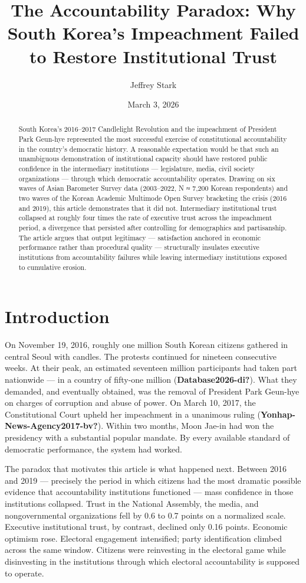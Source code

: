 \documentclass[
  12pt,
  letterpaper]{article}
\title{The Accountability Paradox: Why South Korea's Impeachment Failed
to Restore Institutional Trust}
\author{Jeffrey Stark}
\date{March 3, 2026}
\begin{document}
\maketitle
\begin{abstract}
South Korea's 2016--2017 Candlelight Revolution and the impeachment of
President Park Geun-hye represented the most successful exercise of
constitutional accountability in the country's democratic history. A
reasonable expectation would be that such an unambiguous demonstration
of institutional capacity should have restored public confidence in the
intermediary institutions --- legislature, media, civil society
organizations --- through which democratic accountability operates.
Drawing on six waves of Asian Barometer Survey data (2003--2022, N ≈
7,200 Korean respondents) and two waves of the Korean Academic Multimode
Open Survey bracketing the crisis (2016 and 2019), this article
demonstrates that it did not. Intermediary institutional trust collapsed
at roughly four times the rate of executive trust across the impeachment
period, a divergence that persisted after controlling for demographics
and partisanship. The article argues that output legitimacy ---
satisfaction anchored in economic performance rather than procedural
quality --- structurally insulates executive institutions from
accountability failures while leaving intermediary institutions exposed
to cumulative erosion.
\end{abstract}


\section{Introduction}\label{introduction}

On November 19, 2016, roughly one million South Korean citizens gathered
in central Seoul with candles. The protests continued for nineteen
consecutive weeks. At their peak, an estimated seventeen million
participants had taken part nationwide --- in a country of fifty-one
million (\textbf{Database2026-di?}). What they demanded, and eventually
obtained, was the removal of President Park Geun-hye on charges of
corruption and abuse of power. On March 10, 2017, the Constitutional
Court upheld her impeachment in a unanimous ruling
(\textbf{Yonhap-News-Agency2017-bv?}). Within two months, Moon Jae-in
had won the presidency with a substantial popular mandate. By every
available standard of democratic performance, the system had worked.

The paradox that motivates this article is what happened next. Between
2016 and 2019 --- precisely the period in which citizens had the most
dramatic possible evidence that accountability institutions functioned
--- mass confidence in those institutions collapsed. Trust in the
National Assembly, the media, and nongovernmental organizations fell by
0.6 to 0.7 points on a normalized scale. Executive institutional trust,
by contrast, declined only 0.16 points. Economic optimism rose.
Electoral engagement intensified; party identification climbed across
the same window. Citizens were reinvesting in the electoral game while
disinvesting in the institutions through which electoral accountability
is supposed to operate.
\end{document}
